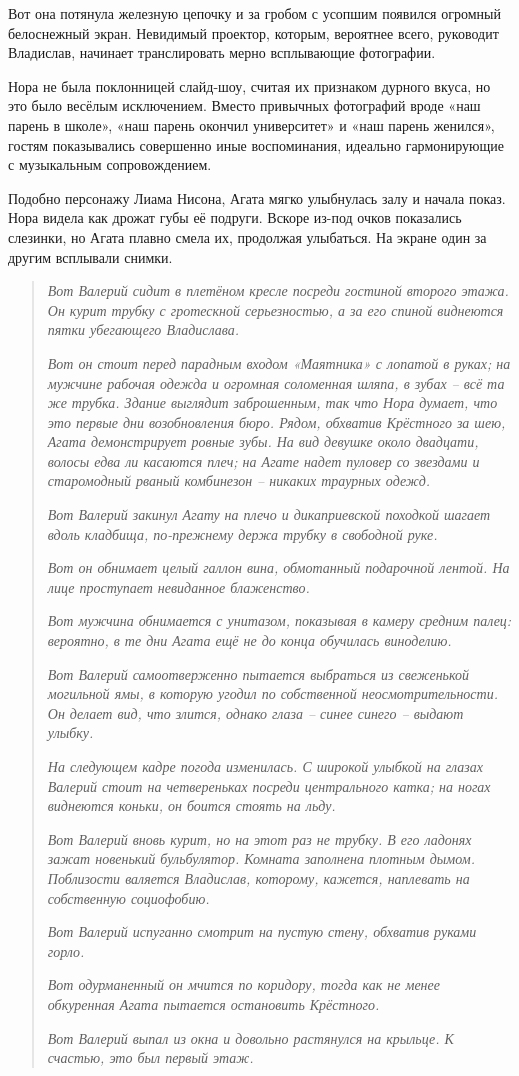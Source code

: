 \documentclass[
  a5paperpaper,
  DIV=11,
  numbers=noendperiod]{scrreprt}
\begin{document}
Вот она потянула железную цепочку и за гробом с усопшим появился
огромный белоснежный экран. Невидимый проектор, которым, вероятнее
всего, руководит Владислав, начинает транслировать мерно всплывающие
фотографии.

Нора не была поклонницей слайд-шоу, считая их признаком дурного вкуса,
но это было весёлым исключением. Вместо привычных фотографий вроде «наш
парень в школе», «наш парень окончил университет» и «наш парень
женился», гостям показывались совершенно иные воспоминания, идеально
гармонирующие с музыкальным сопровождением.

Подобно персонажу Лиама Нисона, Агата мягко улыбнулась залу и начала
показ. Нора видела как дрожат губы её подруги. Вскоре из-под очков
показались слезинки, но Агата плавно смела их, продолжая улыбаться. На
экране один за другим всплывали снимки.

\begin{quote}
\emph{Вот Валерий сидит в плетёном кресле посреди гостиной второго
этажа. Он курит трубку с гротескной серьезностью, а за его спиной
виднеются пятки убегающего Владислава.}

\emph{Вот он стоит перед парадным входом «Маятника» с лопатой в руках;
на мужчине рабочая одежда и огромная соломенная шляпа, в зубах -- всё та
же трубка. Здание выглядит заброшенным, так что Нора думает, что это
первые дни возобновления бюро. Рядом, обхватив Крёстного за шею, Агата
демонстрирует ровные зубы. На вид девушке около двадцати, волосы едва ли
касаются плеч; на Агате надет пуловер со звездами и старомодный рваный
комбинезон -- никаких траурных одежд.}

\emph{Вот Валерий закинул Агату на плечо и дикаприевской походкой шагает
вдоль кладбища, по-прежнему держа трубку в свободной руке.}

\emph{Вот он обнимает целый галлон вина, обмотанный подарочной лентой.
На лице проступает невиданное блаженство.}

\emph{Вот мужчина обнимается с унитазом, показывая в камеру средним
палец: вероятно, в те дни Агата ещё не до конца обучилась виноделию.}

\emph{Вот Валерий самоотверженно пытается выбраться из свеженькой
могильной ямы, в которую угодил по собственной неосмотрительности. Он
делает вид, что злится, однако глаза -- синее синего -- выдают улыбку.}

\emph{На следующем кадре погода изменилась. С широкой улыбкой на глазах
Валерий стоит на четвереньках посреди центрального катка; на ногах
виднеются коньки, он боится стоять на льду.}

\emph{Вот Валерий вновь курит, но на этот раз не трубку. В его ладонях
зажат новенький бульбулятор. Комната заполнена плотным дымом. Поблизости
валяется Владислав, которому, кажется, наплевать на собственную
социофобию.}

\emph{Вот Валерий испуганно смотрит на пустую стену, обхватив руками
горло.}

\emph{Вот одурманенный он мчится по коридору, тогда как не менее
обкуренная Агата пытается остановить Крёстного.}

\emph{Вот Валерий выпал из окна и довольно растянулся на крыльце. К
счастью, это был первый этаж.}
\end{quote}
\end{document}

